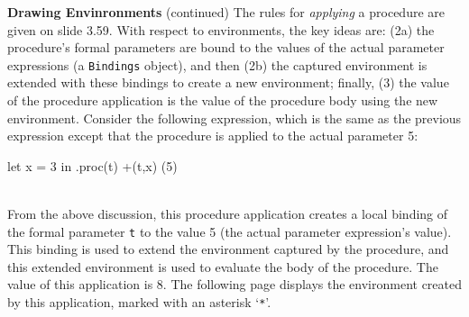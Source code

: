 \begin{minipage}[t]{\sw}
\slidenumber
\LARGE
{\bf Drawing Envinronments} (continued)\exx
The rules for {\em applying} a procedure are given on slide 3.59.
With respect to environments,
the key ideas are:
(2a) the procedure's formal parameters are bound
to the values of the actual parameter expressions
(a \verb'Bindings' object), and then
(2b)
the captured environment is extended
with these bindings to create a new environment; finally,
(3) the value of the procedure application
is the value of the procedure body
using the new environment.\exx
Consider the following expression,
which is the same as the previous expression except
that the procedure is applied to the actual parameter 5:\\[1.5ex]
\Large
\begin{verbbox}
let
  x = 3
in
  .proc(t) +(t,x) (5)
\end{verbbox}
\emm\theverbbox\\[1.5ex]
\LARGE
From the above discussion,
this procedure application creates a local binding
of the formal parameter \verb't' to the value 5
(the actual parameter expression's value).
This binding is used to extend the environment captured
by the procedure,
and this extended environment is used
to evaluate the body of the procedure.
The value of this application is 8.\exx
The following page displays the environment created by this application,
marked with an asterisk `\verb'*''.
\end{minipage}
